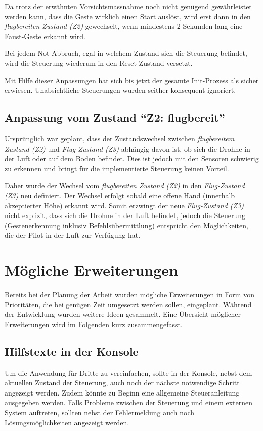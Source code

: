 Da trotz der erwähnten Vorsichtsmassnahme noch nicht genügend gewährleistet werden kann, dass die Geste wirklich einen Start auslöst, wird erst dann in den \textit{flugbereiten Zustand (Z2)} gewechselt, wenn mindestens 2 Sekunden lang eine Faust-Geste erkannt wird.

Bei jedem Not-Abbruch, egal in welchem Zustand sich die Steuerung befindet, wird die Steuerung wiederum in den Reset-Zustand versetzt.

Mit Hilfe dieser Anpassungen hat sich bis jetzt der gesamte Init-Prozess als sicher erwiesen.
Unabsichtliche Steuerungen wurden seither konsequent ignoriert.

\subsection{Anpassung vom Zustand "`Z2: flugbereit"'}
Ursprünglich war geplant, dass der Zustandswechsel zwischen \textit{flugbereitem Zustand (Z2)} und \textit{Flug-Zustand (Z3)} abhängig davon ist, ob sich die Drohne in der Luft oder auf dem Boden befindet.
Dies ist jedoch mit den Sensoren schwierig zu erkennen und bringt für die implementierte Steuerung keinen Vorteil.

Daher wurde der Wechsel vom \textit{flugbereiten Zustand (Z2)} in den \textit{Flug-Zustand (Z3)} neu definiert.
Der Wechsel erfolgt sobald eine offene Hand (innerhalb akzeptierter Höhe) erkannt wird.
Somit erzwingt der neue \textit{Flug-Zustand (Z3)} nicht explizit, dass sich die Drohne in der Luft befindet, jedoch die Steuerung (Gestenerkennung inklusiv Befehlsübermittlung) entspricht den Möglichkeiten, die der Pilot in der Luft zur Verfügung hat.



\section{Mögliche Erweiterungen}
\label{sec:extensions}
Bereits bei der Planung der Arbeit wurden mögliche Erweiterungen in Form von Prioritäten, die bei genügen Zeit umgesetzt werden sollen, eingeplant.
Während der Entwicklung wurden weitere Ideen gesammelt.
Eine Übersicht möglicher Erweiterungen wird im Folgenden kurz zusammengefasst.

\subsection{Hilfstexte in der Konsole}
Um die Anwendung für Dritte zu vereinfachen, sollte in der Konsole, nebst dem aktuellen Zustand der Steuerung, auch noch der nächste notwendige Schritt angezeigt werden.
Zudem könnte zu Beginn eine allgemeine Steueranleitung ausgegeben werden.
Falls Probleme zwischen der Steuerung und einem externen System auftreten, sollten nebst der Fehlermeldung auch noch Lösungsmöglichkeiten angezeigt werden.

